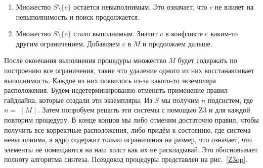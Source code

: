 \begin{enumerate}
\item Множество $S\setminus\{c\}$ остается невыполнимым. Это означает, что $c$ не влияет на невыполнимость и поиск продолжается.
\item Множество $S\setminus\{c\}$ стало выполнимым. Значит $c$ в конфликте с каким-то другим ограничением. Добавляем $c$ в $M$ и продолжаем дальше.
\end{enumerate}

После окончания выполнения процедуры множество $M$ будет содержать по построению все ограничения, такие что удаление одного из них восстанавливает выполнимость.
Каждое из них появилось из-за какого-то экземпляра расположения. Будем недетерминированно отменять применение правил гайдлайна, которые создали эти экземпляры.
Из $S$ мы получим $n$ подсистем, где $n=\ \mid\!\!\!M\!\!\!\mid$. Затем попробуем решить эти системы с помощью \textsc{Z3} и для каждой повторим процедуру.
В конце концов мы либо отменим достаточно правил, чтобы получить все корректные расположения, либо придём к состоянию, где система невыполнима, а ядро содержит только ограничения на размер, что означает, что элементы не помещаются на наш холст как   их не раскладывай. Это обосновывает полноту алгоритма синтеза.
Псевдокод процедуры представлен на рис.~\ref{Z3op}.



